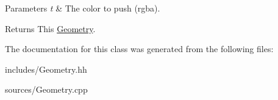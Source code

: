 \begin{DoxyParams}{Parameters}
{\em t} & The color to push (rgba). \\
\hline
\end{DoxyParams}
\begin{DoxyReturn}{Returns}
This \hyperlink{classgdl_1_1_geometry}{Geometry}. 
\end{DoxyReturn}


The documentation for this class was generated from the following files\-:\begin{DoxyCompactItemize}
\item 
includes/Geometry.\-hh\item 
sources/Geometry.\-cpp\end{DoxyCompactItemize}
